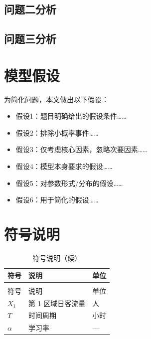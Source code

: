 \documentclass[a4paper, 12pt]{article}
\begin{document}
\subsection{问题二分析}

\subsection{问题三分析}

\section{模型假设}

为简化问题，本文做出以下假设：

\begin{itemize}
  \item 假设1：题目明确给出的假设条件……
  \item 假设2：排除小概率事件……
  \item 假设3：仅考虑核心因素，忽略次要因素……
  \item 假设4：模型本身要求的假设……
  \item 假设5：对参数形式/分布的假设……
  \item 假设6：用于简化的假设……
\end{itemize}

\section{符号说明}

\begin{longtable}{>{\centering\arraybackslash}p{}>{\centering\arraybackslash}p{}>{\centering\arraybackslash}p{}}
  \caption{符号说明}
  \label{tab:symbols} \\
  \toprule
  符号 & 说明 & 单位 \\
  \midrule
  \endfirsthead
  \caption{符号说明（续）} \\
  \toprule
  符号 & 说明 & 单位 \\
  \midrule
  \endhead
  \bottomrule
  \endfoot
  $X_1$ & 第 1 区域日客流量 & 人 \\
  $T$ & 时间周期 & 小时 \\
  $\alpha$ & 学习率 & --- \\
\end{longtable}
\end{document}
